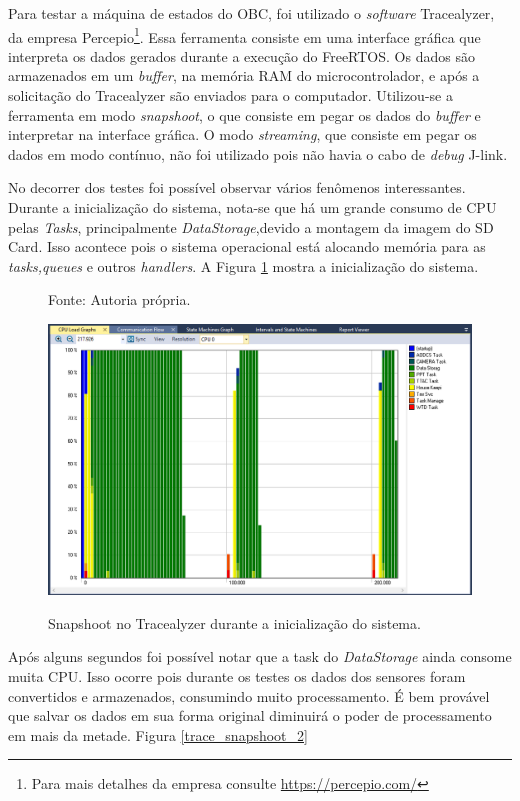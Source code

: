 Para testar a máquina de estados do OBC, foi utilizado o \textit{software} Tracealyzer, da empresa Percepio\footnote{Para mais detalhes da empresa consulte \url{https://percepio.com/}}. Essa ferramenta consiste em uma interface gráfica que interpreta os dados gerados durante a execução do FreeRTOS. Os dados são armazenados em um \textit{buffer}, na memória RAM do microcontrolador, e após a solicitação do Tracealyzer são enviados para o computador. Utilizou-se a ferramenta em modo \textit{snapshoot}, o que consiste em pegar os dados do \textit{buffer} e interpretar na interface gráfica. O modo \textit{streaming}, que consiste em pegar os dados em modo contínuo, não foi utilizado pois não havia o cabo de \textit{debug} J-link.

No decorrer dos testes foi possível observar vários fenômenos interessantes. Durante a inicialização do sistema, nota-se que há um grande consumo de CPU pelas \textit{Tasks}, principalmente \textit{DataStorage},devido a montagem da imagem do SD Card. Isso acontece pois o sistema operacional está alocando memória para as \textit{tasks,queues} e outros \textit{handlers}. A Figura \ref{trace_snapshoot_1} mostra a inicialização do sistema.

\begin{figure}[h]
\footnotesize{	
	\centering
			\centering
	\footnotesize{Fonte: Autoria própria.}
	\caption{Snapshoot no Tracealyzer durante a inicialização do sistema.}
	\includegraphics[keepaspectratio=true,scale=0.51]{figuras/trace_snapshoot_1.PNG}
	
	\label{trace_snapshoot_1}
}
\end{figure}
\FloatBarrier

Após alguns segundos foi possível notar que a task do \textit{DataStorage} ainda consome muita CPU. Isso ocorre pois durante os testes os dados dos sensores foram convertidos e armazenados, consumindo muito processamento. É bem provável que salvar os dados em sua forma original diminuirá o poder de processamento em mais da metade. Figura \ref{trace_snapshoot_2}


